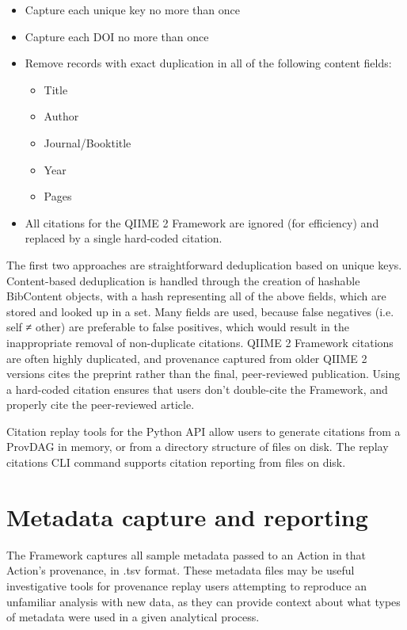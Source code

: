\begin{itemize}
\item Capture each unique key no more than once
\item Capture each DOI no more than once
\item Remove records with exact duplication in all of the following content fields:
    \begin{itemize}
    \item Title
    \item Author
    \item Journal/Booktitle
    \item Year
    \item Pages
    \end{itemize}
\item All citations for the QIIME 2 Framework are ignored (for efficiency) and replaced by a single hard-coded citation.
\end{itemize}

The first two approaches are straightforward deduplication based on unique keys.
Content-based deduplication is handled through the creation of hashable
BibContent objects, with a hash representing all of the above fields, which are
stored and looked up in a set. Many fields are used, because false negatives
(i.e. self ≠ other) are preferable to false positives, which would result in
the inappropriate removal of non-duplicate citations.  QIIME 2 Framework
citations are often highly duplicated, and provenance captured from older
QIIME 2 versions cites the preprint rather than the final, peer-reviewed
publication. Using a hard-coded citation ensures that users don’t double-cite
the Framework, and properly cite the peer-reviewed article.

Citation replay tools for the Python API allow users to generate citations from
a ProvDAG in memory, or from a directory structure of files on disk. The replay
citations CLI command supports citation reporting from files on disk.

\section{Metadata capture and reporting}

The Framework captures all sample metadata passed to an Action in that Action’s
provenance, in .tsv format. These metadata files may be useful investigative
tools for provenance replay users attempting to reproduce an unfamiliar analysis
with new data, as they can provide context about what types of metadata were
used in a given analytical process.

